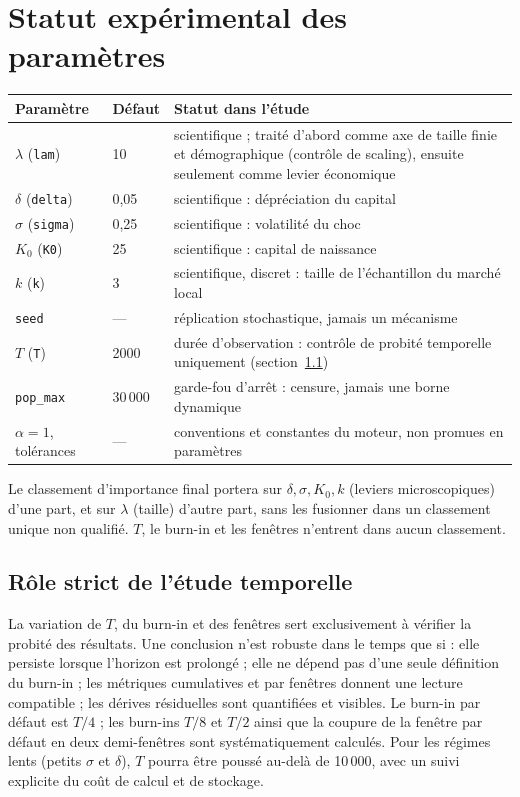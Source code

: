\documentclass[11pt,a4paper]{article}
\newcommand{\code}[1]{\texttt{#1}}
\begin{document}
\section{Statut expérimental des paramètres}
\label{sec:parametres}

\begin{center}
\begin{tabularx}{\textwidth}{@{}llX@{}}
\toprule
Paramètre & Défaut & Statut dans l'étude \\
\midrule
$\lambda$ (\code{lam}) & 10 & scientifique ; traité d'abord comme axe de
taille finie et démographique (contrôle de scaling), ensuite seulement
comme levier économique \\
$\delta$ (\code{delta}) & 0{,}05 & scientifique : dépréciation du capital \\
$\sigma$ (\code{sigma}) & 0{,}25 & scientifique : volatilité du choc \\
$K_0$ (\code{K0}) & 25 & scientifique : capital de naissance \\
$k$ (\code{k}) & 3 & scientifique, discret : taille de l'échantillon du
marché local \\
\code{seed} & --- & réplication stochastique, jamais un mécanisme \\
$T$ (\code{T}) & 2000 & durée d'observation : contrôle de probité
temporelle uniquement (section~\ref{sec:temps}) \\
\code{pop\_max} & 30\,000 & garde-fou d'arrêt : censure, jamais une borne
dynamique \\
$\alpha=1$, tolérances & --- & conventions et constantes du moteur, non
promues en paramètres \\
\bottomrule
\end{tabularx}
\end{center}

Le classement d'importance final portera sur $\delta,\sigma,K_0,k$ (leviers
microscopiques) d'une part, et sur $\lambda$ (taille) d'autre part, sans
les fusionner dans un classement unique non qualifié. $T$, le burn-in et
les fenêtres n'entrent dans aucun classement.

\subsection{Rôle strict de l'étude temporelle}
\label{sec:temps}

La variation de $T$, du burn-in et des fenêtres sert exclusivement à
vérifier la probité des résultats. Une conclusion n'est robuste dans le
temps que si : elle persiste lorsque l'horizon est prolongé ; elle ne
dépend pas d'une seule définition du burn-in ; les métriques cumulatives et
par fenêtres donnent une lecture compatible ; les dérives résiduelles sont
quantifiées et visibles. Le burn-in par défaut est $T/4$ ; les burn-ins
$T/8$ et $T/2$ ainsi que la coupure de la fenêtre par défaut en deux
demi-fenêtres sont systématiquement calculés. Pour les régimes lents
(petits $\sigma$ et $\delta$), $T$ pourra être poussé au-delà de 10\,000,
avec un suivi explicite du coût de calcul et de stockage.
\end{document}

